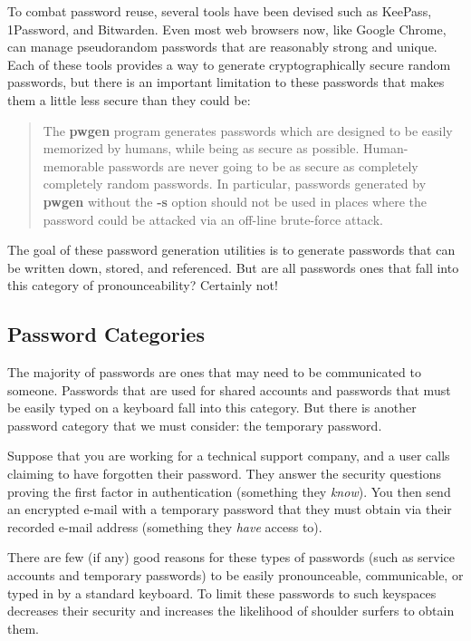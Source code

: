 To combat password reuse, several tools have been devised such as KeePass, 1Password, and Bitwarden. Even most web browsers now, like Google Chrome, can manage pseudorandom passwords that are reasonably strong and unique. Each of these tools provides a way to generate cryptographically secure random passwords, but there is an important limitation to these passwords that makes them a little less secure than they could be:
\begin{quote}
The \textbf{pwgen} program generates passwords which are designed to be easily memorized by humans, while being as secure as possible. Human-memorable passwords are never going to be as secure as completely completely random passwords. In particular, passwords generated by \textbf{pwgen} without the \textbf{-s} option should not be used in places where the password could be attacked via an off-line brute-force attack.\autocite{20210816:pwgen}
\end{quote}

The goal of these password generation utilities is to generate passwords that can be written down, stored, and referenced. But are all passwords ones that fall into this category of pronounceability? Certainly not!

\subsection{Password Categories}

The majority of passwords are ones that may need to be communicated to someone. Passwords that are used for shared accounts and passwords that must be easily typed on a keyboard fall into this category. But there is another password category that we must consider: the temporary password.

Suppose that you are working for a technical support company, and a user calls claiming to have forgotten their password. They answer the security questions proving the first factor in authentication (something they \textit{know}). You then send an encrypted e-mail with a temporary password that they must obtain via their recorded e-mail address (something they \textit{have} access to).

There are few (if any) good reasons for these types of passwords (such as service accounts and temporary passwords) to be easily pronounceable, communicable, or typed in by a standard keyboard. To limit these passwords to such keyspaces decreases their security and increases the likelihood of shoulder surfers to obtain them.

